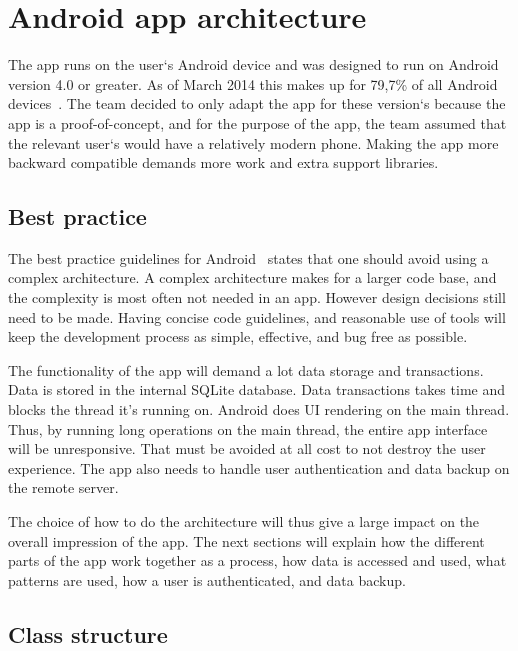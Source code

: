 \section{Android app architecture}
The app runs on the user`s Android device and was designed to run on Android version 4.0 or greater. As of March 2014 this makes up for 79,7\% of all Android devices~\cite{AndroidDeviceFragmentation}.
The team decided to only adapt the app for these version`s because the app is a proof-of-concept, and for the purpose of the app, the team assumed that the relevant user`s would have a relatively modern phone. Making the app more backward compatible demands more work and extra support libraries. 

\subsection{Best practice}

The best practice guidelines for Android~\cite{androidPracticePerformance} states that one should avoid using a complex architecture. A complex architecture makes for a larger code base, and the complexity is most often not needed in an app. However design decisions still need to be made. Having concise code guidelines, and reasonable use of tools will keep the development process as simple, effective, and bug free as possible. 

The functionality of the app will demand a lot data storage and transactions. Data is stored in the internal SQLite database. Data transactions takes time and blocks the thread it's running on.
Android does UI rendering on the main thread. Thus, by running long operations on the main thread, the entire app interface will be unresponsive. That must be avoided at all cost to not destroy the user experience. The app also needs to handle user authentication and data backup on the remote server.

The choice of how to do the architecture will thus give a large impact on the overall impression of the app. The next sections will explain how the different parts of the app work together as a process, how data is accessed and used, what patterns are used, how a user is authenticated, and data backup.


\subsection{Class structure}

